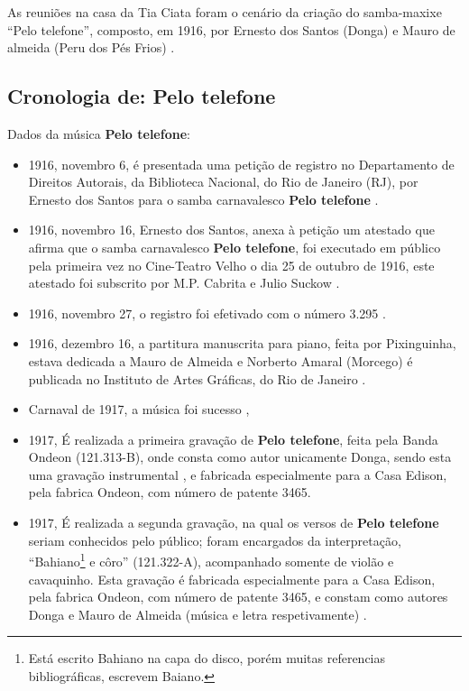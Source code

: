  As reuniões na casa da Tia Ciata foram o cenário da criação do samba-maxixe ``Pelo telefone'',
 composto, em 1916, 
por Ernesto dos Santos (Donga) e Mauro de almeida 
(Peru dos Pés Frios) \cite[pp. 34]{diniz2006almanaque} \cite[pp. 49]{diniz2008almanaque} 
\cite{musicapelotelefone} \cite[pp. 28]{diniz2003almanaque}.

\subsection{Cronologia de: Pelo telefone}
Dados da música \textbf{Pelo telefone}:
\begin{itemize}
\item 1916, novembro 6, é presentada uma petição de registro no
Departamento de Direitos Autorais, da Biblioteca Nacional, 
do Rio de Janeiro (RJ), 
por   Ernesto dos Santos  para o samba carnavalesco \textbf{Pelo telefone} \cite[pp. 599]{marcondes1977enciclopediav2}.
\item 1916, novembro 16, Ernesto dos Santos, 
anexa à petição um atestado que afirma que 
o samba carnavalesco \textbf{Pelo telefone}, 
foi executado em público pela primeira vez no
Cine-Teatro Velho o dia 25 de outubro de 1916,
este atestado foi subscrito por M.P. Cabrita e Julio Suckow \cite[pp. 599]{marcondes1977enciclopediav2}.
\item 1916, novembro 27, o registro foi efetivado com o número 3.295 \cite[pp. 599]{marcondes1977enciclopediav2}.
\item 1916, dezembro 16, a partitura manuscrita para piano, feita por Pixinguinha, 
estava dedicada a Mauro de Almeida e Norberto Amaral (Morcego) é
publicada no Instituto de Artes Gráficas, do Rio de Janeiro \cite[pp. 599]{marcondes1977enciclopediav2} \cite[pp 1]{revistausp1}.
\item Carnaval de 1917, a música foi sucesso   \cite[pp. 599]{marcondes1977enciclopediav2}  \cite[pp. 35]{diniz2006almanaque}, 

\item 1917, É realizada a primeira gravação de  \textbf{Pelo telefone}, feita pela Banda Ondeon (121.313-B), 
onde consta como autor unicamente Donga, 
sendo esta uma gravação instrumental \cite{musicapelotelefone} \cite[pp. 599]{marcondes1977enciclopediav2},
e  fabricada especialmente para a Casa Edison, pela fabrica Ondeon, com número de patente 3465.
\item 1917, É realizada a segunda gravação, na qual os versos de \textbf{Pelo telefone} seriam conhecidos pelo público;
foram encargados da interpretação, ``Bahiano\footnote{Está 
escrito Bahiano na capa do disco, porém muitas referencias bibliográficas,
escrevem Baiano.} e côro'' (121.322-A), acompanhado somente de violão e cavaquinho. 
Esta gravação é fabricada especialmente para a Casa Edison, pela fabrica Ondeon, com número de patente 3465,  
e constam como autores Donga e Mauro de Almeida 
(música e letra respetivamente) \cite[pp. 599]{marcondes1977enciclopediav2} 
\cite[pp. 35]{diniz2006almanaque}  \cite{musicapelotelefone}.
\end{itemize}

